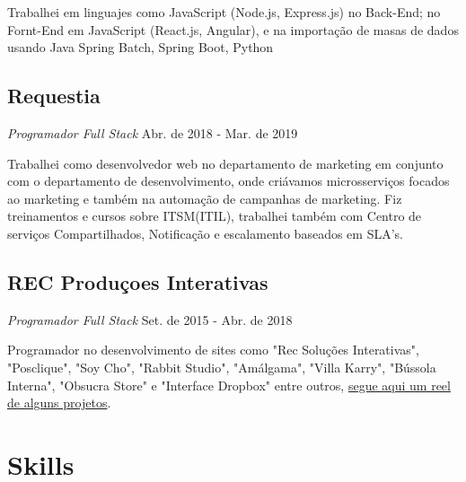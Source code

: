 \documentclass[a4paper,10pt]{article}
\begin{document}
Trabalhei em linguajes como JavaScript (Node.js, Express.js) no Back-End; no Fornt-End em JavaScript (React.js, Angular), e na importação de masas de dados usando Java Spring Batch, Spring Boot, Python

\clearpage

\subsection*{Requestia}
\textcolor{corSubSection}{\emph{Programador Full Stack}}
\hfill \textcolor{corSubSection}{Abr. de 2018 - Mar. de 2019}

Trabalhei como desenvolvedor web no departamento de marketing em conjunto com o departamento de desenvolvimento, onde criávamos microsserviços focados ao marketing e também na automação de campanhas de marketing. Fiz treinamentos e cursos sobre ITSM(ITIL), trabalhei também com Centro de serviços Compartilhados, Notificação e escalamento baseados em SLA's.

\subsection*{REC Produçoes Interativas}
\textcolor{corSubSection}{\emph{Programador Full Stack}}
\hfill \textcolor{corSubSection}{Set. de 2015 - Abr. de 2018}

Programador no desenvolvimento de sites como "Rec Soluções Interativas", "Posclique", "Soy Cho", "Rabbit Studio", "Amálgama", "Villa Karry", "Bússola Interna", "Obsucra Store" e "Interface Dropbox" entre outros, \href{https://www.youtube.com/watch?v=V_ahsuHgIoE}{segue aqui um reel de alguns projetos}.

%

\section*{Skills}
\noindent\makebox[\linewidth]{\rule{\linewidth}{0.1mm}\textcolor{corLarge}{}}
\end{document}
